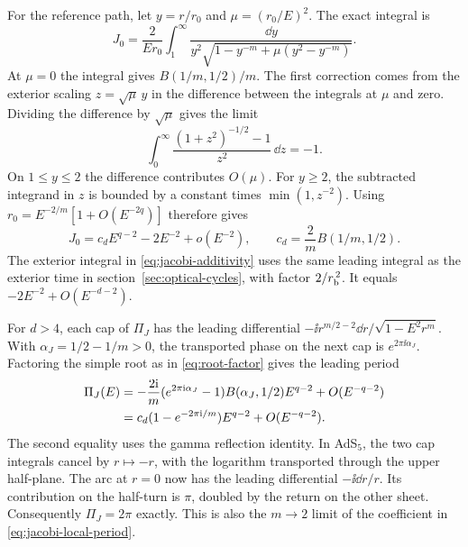 For the reference path, let \(y=r/r_0\) and
\(\mu=(r_0/E)^2\). The exact integral is
\begin{equation}
 J_0=\frac{2}{Er_0}\int_1^\infty
 \frac{\dd y}{y^2\sqrt{1-y^{-m}+\mu(y^2-y^{-m})}}.
 \label{eq:jacobi-reference}
\end{equation}
At \(\mu=0\) the integral gives \(B(1/m,1/2)/m\).
The first correction comes from the exterior scaling
\(z=\sqrt{\mu}\,y\) in the difference between the integrals
at \(\mu\) and zero. Dividing the difference by \(\sqrt\mu\)
gives the limit
\begin{equation}
 \int_0^\infty\frac{(1+z^2)^{-1/2}-1}{z^2}\,\dd z=-1 .
\end{equation}
On \(1\leq y\leq2\) the difference contributes \(O(\mu)\).
For \(y\geq2\), the subtracted integrand in \(z\) is bounded
by a constant times \(\min(1,z^{-2})\).
Using \(r_0=E^{-2/m}[1+O(E^{-2q})]\) therefore gives
\begin{equation}
 J_0=c_d E^{q-2}-2E^{-2}+o(E^{-2}),\qquad
 c_d=\frac{2}{m}B(1/m,1/2).
 \label{eq:jacobi-reference-asymptotic}
\end{equation}
The exterior integral in \eqref{eq:jacobi-additivity} uses the same
leading integral as the exterior time in section~\ref{sec:optical-cycles},
with factor \(2/r_{\rm b}^{\,2}\). It equals
\(-2E^{-2}+O(E^{-d-2})\).

For \(d>4\), each cap of \(\Pi_J\) has the leading differential
\(-\ii r^{m/2-2}\dd r/\sqrt{1-E^2r^m}\). With
\(\alpha_J=1/2-1/m>0\), the transported phase on the next cap
is \(e^{2\pi\ii\alpha_J}\). Factoring the simple root as in
\eqref{eq:root-factor} gives the leading period
\begin{align}
 \Pi_J(E)&=
 -\frac{2\mathrm{i}}{m}(e^{2\pi\mathrm{i}\alpha_J}-1)B(\alpha_J,1/2)
       E^{q-2}+O(E^{-q-2})\notag\\
 &= c_d(1-e^{-2\pi\mathrm{i}/m})E^{q-2}+O(E^{-q-2}).
 \label{eq:jacobi-local-period}
\end{align}
The second equality uses the gamma reflection identity. In AdS\(_5\),
the two cap integrals cancel by \(r\mapsto-r\), with the logarithm
transported through the upper half-plane. The arc at \(r=0\)
now has the leading differential \(-\ii\dd r/r\). Its contribution
on the half-turn is \(\pi\), doubled by the return on the other
sheet. Consequently \(\Pi_J=2\pi\) exactly. This is also the
\(m\to2\) limit of the coefficient in \eqref{eq:jacobi-local-period}.

